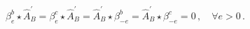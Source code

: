 \begin{equation}
\beta _{e}^{b}\star \hat{A}_{B}^{\prime }=\beta _{e}^{c}\star \hat{A}%
_{B}^{\prime }=\hat{A}_{B}^{\prime }\star \beta _{-e}^{b}=\hat{A}%
_{B}^{\prime }\star \beta _{-e}^{c}=0\,,\quad \forall e>0\,.
\label{evenbutterfly}
\end{equation}

